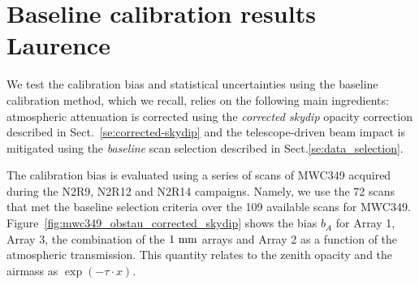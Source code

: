 

\section{Baseline calibration results {\color{LimeGreen} Laurence}}
\label{se:photometry_baseline}

We test the calibration bias and statistical uncertainties using the
baseline calibration method, which we recall, relies on the following
main ingredients: atmospheric attenuation is corrected using
the \emph{corrected skydip} opacity correction described in
Sect.~\ref{se:corrected-skydip}
and the telescope-driven beam impact is mitigated using the
\emph{baseline} scan selection described in
Sect.\ref{se:data_selection}.

The calibration bias is evaluated using a series of scans of MWC349
acquired during the N2R9, N2R12 and N2R14 campaigns. Namely, we use
the 72 scans that met the baseline selection criteria over the 109
available scans for MWC349.
Figure~\ref{fig:mwc349_obstau_corrected_skydip} shows the
bias $b_A$ for Array 1, Array 3, the combination of the $1~\rm{mm}$ arrays and
Array 2 as a function of the atmospheric transmission. This quantity
relates to the zenith opacity and the airmass as
$\exp \left( - \tau \cdot x \right) $.


